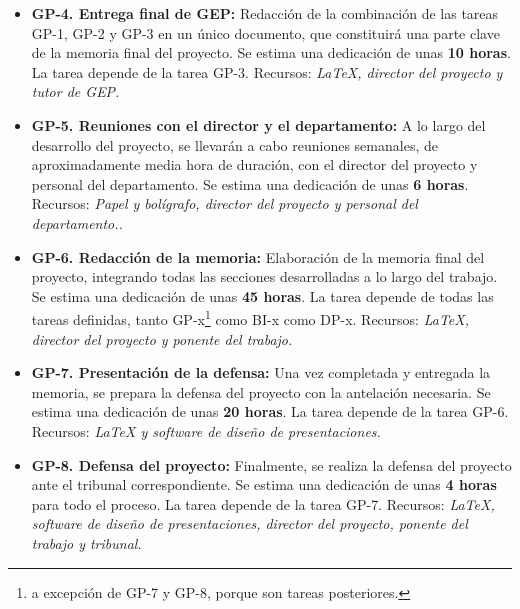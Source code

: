 \begin{itemize}
    \item \textbf{GP-4. Entrega final de GEP:} Redacción de la combinación de las tareas GP-1, GP-2 y GP-3 en un único documento, 
    que constituirá una parte clave de la memoria final del proyecto. Se estima una dedicación de unas \textbf{10 horas}. 
    \newline La tarea depende de la tarea GP-3.
    \newline Recursos: \textit {LaTeX, director del proyecto y tutor de GEP.}
    
    \item \textbf{GP-5. Reuniones con el director y el departamento:} A lo largo del desarrollo del proyecto, se llevarán 
    a cabo reuniones semanales, de aproximadamente media hora de duración, con el director del proyecto y personal del 
    departamento. Se estima una dedicación de unas \textbf{6 horas}. 
    \newline Recursos: \textit {Papel y bolígrafo, director del proyecto y personal del departamento..}
    
    \item \textbf{GP-6. Redacción de la memoria:} Elaboración de la memoria final del proyecto, integrando todas las secciones
    desarrolladas a lo largo del trabajo. Se estima una dedicación de unas \textbf{45 horas}.
    \newline La tarea depende de todas las tareas definidas, tanto GP-x\footnote{a excepción de GP-7 y GP-8, porque son tareas 
    posteriores.} como BI-x como DP-x.
    \newline Recursos: \textit {LaTeX, director del proyecto y ponente del trabajo.}
    
    \item \textbf{GP-7. Presentación de la defensa:} Una vez completada y entregada la memoria, se prepara la defensa del proyecto 
    con la antelación necesaria. Se estima una dedicación de unas \textbf{20 horas}.
    \newline La tarea depende de la tarea GP-6.
    \newline Recursos: \textit {LaTeX y software de diseño de presentaciones.}
    
    \item \textbf{GP-8. Defensa del proyecto:}
    Finalmente, se realiza la defensa del proyecto ante el tribunal correspondiente. Se estima una dedicación de unas \textbf{4 horas} 
    para todo el proceso.
    \newline La tarea depende de la tarea GP-7.
    \newline Recursos: \textit {LaTeX, software de diseño de presentaciones, director del proyecto, ponente del trabajo y tribunal.}
\end{itemize}